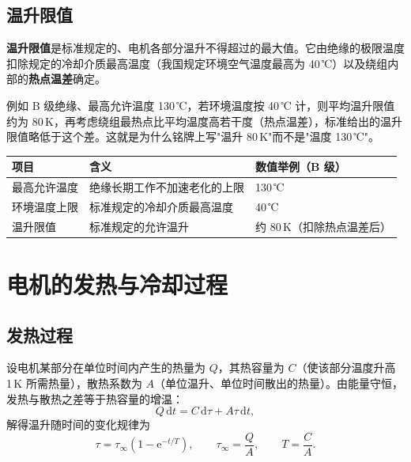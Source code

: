 \subsection{温升限值}
\textbf{温升限值}是标准规定的、电机各部分温升不得超过的最大值。它由绝缘的极限温度扣除规定的冷却介质最高温度（我国规定环境空气温度最高为 40\,℃）以及绕组内部的\textbf{热点温差}确定。

例如 B 级绝缘、最高允许温度 130\,℃，若环境温度按 40\,℃ 计，则平均温升限值约为 80\,K，再考虑绕组最热点比平均温度高若干度（热点温差），标准给出的温升限值略低于这个差。这就是为什么铭牌上写"温升 80\,K"而不是"温度 130\,℃"。

\begin{center}
\begin{tabular}{@{}lll@{}}
\toprule
项目 & 含义 & 数值举例（B 级） \\
\midrule
最高允许温度 & 绝缘长期工作不加速老化的上限 & 130\,℃ \\
环境温度上限 & 标准规定的冷却介质最高温度 & 40\,℃ \\
温升限值 & 标准规定的允许温升 & 约 80\,K（扣除热点温差后） \\
\bottomrule
\end{tabular}
\end{center}


\section{电机的发热与冷却过程}

\subsection{发热过程}
设电机某部分在单位时间内产生的热量为 $Q$，其热容量为 $C$（使该部分温度升高 1\,K 所需热量），散热系数为 $A$（单位温升、单位时间散出的热量）。由能量守恒，发热与散热之差等于热容量的增温：
\begin{equation}
Q\,\mathrm{d}t=C\,\mathrm{d}\tau+A\tau\,\mathrm{d}t ,
\end{equation}
解得温升随时间的变化规律为
\begin{equation}
\tau=\tau_\infty\left(1-\mathrm{e}^{-t/T}\right),\qquad
\tau_\infty=\frac{Q}{A},\qquad
T=\frac{C}{A}.
\end{equation}

